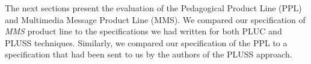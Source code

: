 \documentclass{acm_proc_article-sp}
\begin{document}
The next sections present the evaluation of the Pedagogical Product Line (PPL)
and Multimedia Message Product Line (MMS). We compared our specification of
\emph{MMS} product line to the specifications we had written for both PLUC and
PLUSS techniques. Similarly, we compared our specification
of the PPL to a specification that had been sent to us by
the authors of the PLUSS approach. 
 


% 
\end{document}
